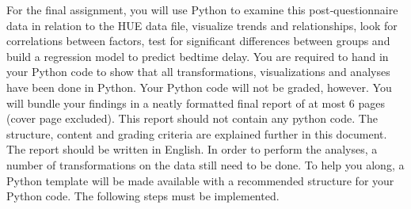 \documentclass[a4paper]{report}
\theoremstyle{definition}
\newcommand{\blankline}{\par\vspace{5mm}}
\begin{document}
	\blankline \noindent For the final assignment, you will use Python to examine this post‐questionnaire data in relation to the HUE data file, visualize trends and relationships, look for correlations between factors, test for significant differences between groups and build a regression model to predict bedtime delay. You are required to hand in your Python code to show that all transformations, visualizations and analyses have been done in Python. Your Python code will not be graded, however. You will bundle your findings in a neatly formatted final report of at most 6 pages (cover page excluded). This report should not contain any python code. The structure, content and grading criteria are explained further in this document. The report should be written in English. In order to perform the analyses, a number of transformations on the data still need to be done. To help you along, a Python template will be made available with a recommended structure for your Python code. The following steps must be implemented.
	
\end{document}
